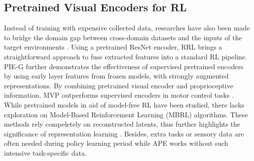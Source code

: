 \subsection{Pretrained Visual Encoders for RL}

Instead of training with expensive collected data, researches have also been made to bridge the domain gap between cross-domain datasets and the inputs of the target environments \cite{Ma2022VIPTU, Hu2023ForPV}. Using a pretrained ResNet encoder, RRL \cite{RRL} brings a straightforward approach to fuse extracted features into a standard RL pipeline. PIE-G \cite{Yuan2022PreTrainedIE} further demonstrates the effectiveness of supervised pretrained encoders by using early layer features from frozen models, with strongly augmented representations. By combining pretrained visual encoder and proprioceptive information, MVP outperforms supervised encoders in motor control tasks \cite{Xiao2022MaskedVP}. While pretrained models in aid of model-free RL have been studied, there lacks exploration on Model-Based Reinforcement Learning (MBRL) algorithms. These methods rely compeletely on reconstructed latents, thus further highlights the significance of representation learning \cite{Poudel2023ReCoReRC}.
Besides, extra tasks or sensory data are often needed during policy learning period while APE works without such intensive task-specific data.